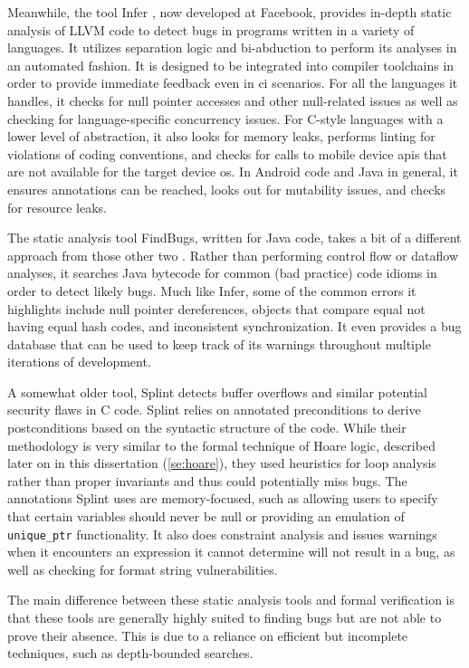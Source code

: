 Meanwhile, the tool Infer \autocite{calcagno2011infer}, now developed at Facebook,
provides in-depth static analysis of LLVM code to detect bugs in programs
written in a variety of languages.
It utilizes separation logic \autocite{reynolds2002separation}
and bi-abduction to perform its analyses in an automated fashion.
It is designed to be integrated into compiler toolchains
in order to provide immediate feedback even in \ac{ci} scenarios.
For all the languages it handles, it checks for null pointer accesses
and other null-related issues as well as checking for language-specific
concurrency issues.
For C-style languages with a lower level of abstraction,
it also looks for memory leaks, performs linting for violations of coding conventions,
and checks for calls to mobile device \acp{api} that are not available
for the target device \ac{os}.
In Android code and Java in general, it ensures annotations can be reached,
looks out for mutability issues, and checks for resource leaks.

The static analysis tool FindBugs, written for Java code,
takes a bit of a different approach from those other two
\autocite{hovemeyer2004findbugs}.
Rather than performing control flow or dataflow analyses,
it searches Java bytecode for common (bad practice) code idioms
in order to detect likely bugs. Much like Infer,
some of the common errors it highlights include null pointer dereferences,
objects that compare equal not having equal hash codes,
and inconsistent synchronization.
It even provides a bug database that can be used to keep track of its warnings
throughout multiple iterations of development.

A somewhat older tool, Splint \autocite{evans2002static} detects buffer overflows
and similar potential security flaws in C code.
Splint relies on annotated preconditions to derive postconditions
based on the syntactic structure of the code.
While their methodology is very similar to the formal technique of Hoare logic,
described later on in this dissertation (\cref{se:hoare}),
they used heuristics for loop analysis rather than proper invariants
and thus could potentially miss bugs.
The annotations Splint uses are memory-focused, such as allowing users to specify
that certain variables should never be null or providing an emulation of
\lstinline|unique_ptr| functionality. It also does constraint analysis
and issues warnings when it encounters an expression it cannot determine
will not result in a bug, as well as checking for format string vulnerabilities.

The main difference between these static analysis tools and formal verification
is that these tools are generally highly suited to finding bugs
but are not able to prove their absence. This is due to a reliance on
efficient but incomplete techniques, such as depth-bounded searches.

